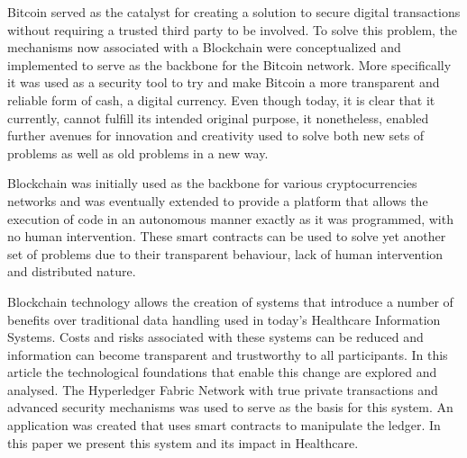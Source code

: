 \begin{tueABSTRACT}

  Bitcoin served as the catalyst for creating a solution to secure digital
  transactions without requiring a trusted third party to be involved. To solve
  this problem, the mechanisms now associated with a Blockchain were
  conceptualized and implemented to serve as the backbone for the Bitcoin
  network. More specifically it was used as a security tool to try and make
  Bitcoin a more transparent and reliable form of cash, a digital currency.
  Even though today, it is clear that it currently, cannot fulfill its intended
  original purpose, it nonetheless, enabled further avenues for innovation and
  creativity used to solve both new sets of problems as well as old problems in
  a new way.

  Blockchain was initially used as the backbone for various cryptocurrencies
  networks and was eventually extended to provide a platform that allows the
  execution of code in an autonomous manner exactly as it was programmed, with
  no human intervention. These smart contracts can be used to solve yet another
  set of problems due to their transparent behaviour, lack of human
  intervention and distributed nature. 

  Blockchain technology allows the creation of systems that introduce a number
  of benefits over traditional data handling used in today's Healthcare
  Information Systems. Costs and risks associated with these systems can be
  reduced and information can become transparent and trustworthy to all
  participants. In this article the technological foundations that enable this
  change are explored and analysed. The Hyperledger Fabric Network with true
  private transactions and advanced security mechanisms was used to serve as
  the basis for this system. An application was created that uses smart
  contracts to manipulate the ledger. In this paper we present this system and
  its impact in Healthcare.

\end{tueABSTRACT}

